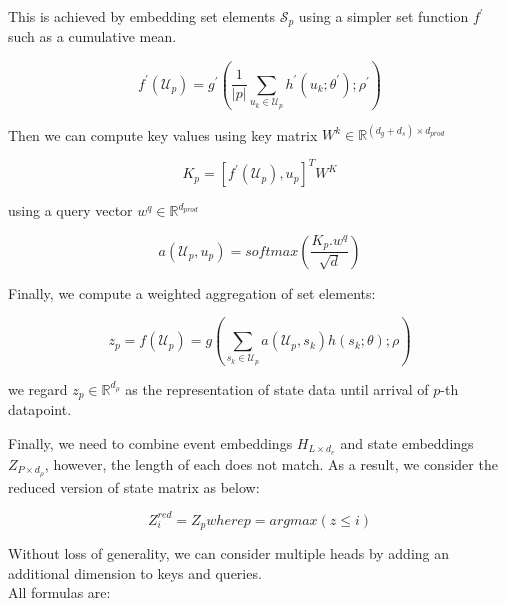 \documentclass[journal,twoside,web]{ieeecolor}
\begin{document}
This is achieved by embedding set elements $\mathcal{S}_p$ using a simpler set function $f^{\prime}$ such as a cumulative mean.

\begin{equation}
    f^{\prime}(\mathcal{U}_p) = g^{\prime} \left(  \frac{1}{|p|} \sum_{u_k \in \mathcal{U}_p}  h^{\prime}(u_k;\theta^{\prime}) ;\rho^{\prime}\right) 
\end{equation}

Then we can compute key values using key matrix $W^k \in \mathbb{R}^{(d_g+d_s) \times d_{prod}}$


\begin{equation}
    K_p=[f^{\prime}(\mathcal{U}_p), u_p]^T W^K   
\end{equation}

using a query vector $w^q \in \mathbb{R}^{d_{prod}}$

\begin{equation*}
    a(\mathcal{U}_p,u_p)=  softmax(\frac{K_p.w^q}{\sqrt{d}  })
\end{equation*}


Finally, we compute a weighted aggregation of set elements:

\begin{equation*}
    z_p = f(\mathcal{U}_p) =     
    g\left(
    \sum_{s_k \in \mathcal{U}_p}  a(\mathcal{U}_p,s_k)h(s_k;\theta);\rho 
    \right) 
\end{equation*}

we regard $z_p \in \mathbb{R}^{d_{\rho}}$ as the representation of state data until arrival of $p$-th datapoint.


Finally, we need to combine event embeddings $ H_{L \times d_e}$ and state embeddings $Z_{P \times d_{\rho}}$, however, the length of each does not match. As a result, we consider the reduced version of state matrix as below:

\begin{equation*}
    Z^{red}_i=Z_p where p=argmax(z \leq i)
\end{equation*}





Without loss of generality, we can consider multiple heads by adding an additional dimension to keys and queries.\\


All formulas are:
\end{document}

